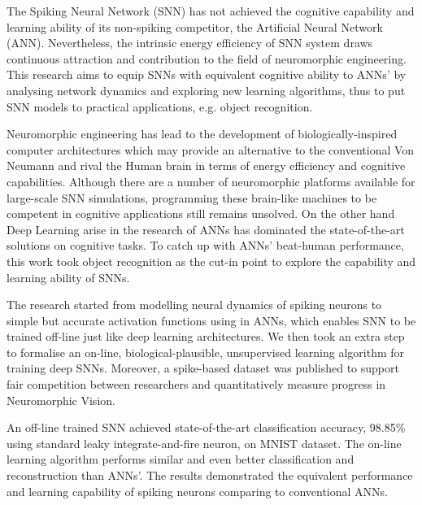 The Spiking Neural Network (SNN) has not achieved the cognitive capability and learning ability of its non-spiking competitor, the Artificial Neural Network (ANN).
Nevertheless, the intrinsic energy efficiency of SNN system draws continuous attraction and contribution to the field of neuromorphic engineering.
This research aims to equip SNNs with equivalent cognitive ability to ANNs' by analysing network dynamics and exploring new learning algorithms, thus to put SNN models to practical applications, e.g. object recognition.

Neuromorphic engineering has lead to the development of biologically-inspired computer architectures which may provide an alternative to the conventional Von Neumann and rival the Human brain in terms of energy efficiency and cognitive capabilities.
Although there are a number of neuromorphic platforms available for large-scale SNN simulations, programming these brain-like machines to be competent in cognitive applications still remains unsolved.
On the other hand Deep Learning arise in the research of ANNs has dominated the state-of-the-art solutions on cognitive tasks.
To catch up with ANNs' beat-human performance, this work took object recognition as the cut-in point to explore the capability and learning ability of SNNs.

The research started from modelling neural dynamics of spiking neurons to simple but accurate activation functions using in ANNs, which enables SNN to be trained off-line just like deep learning architectures.
We then took an extra step to formalise an on-line, biological-plausible, unsupervised learning algorithm for training deep SNNs.
Moreover, a spike-based dataset was published to support fair competition between researchers and quantitatively measure progress in Neuromorphic Vision.

An off-line trained SNN achieved state-of-the-art classification accuracy, 98.85\% using standard leaky integrate-and-fire neuron, on MNIST dataset. 
The on-line learning algorithm performs similar and even better classification and reconstruction than ANNs'. 
The results demonstrated the equivalent performance and learning capability of spiking neurons comparing to conventional ANNs.
